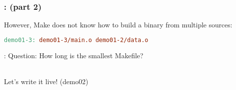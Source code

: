 \begin{frame}[fragile]
    \frametitle{\secname: \small\subsecname (part 2)\normalsize}

    However, Make does not know how to build a binary from multiple sources:

    \begin{lstlisting}[language=make]
demo01-3: demo01-3/main.o demo01-2/data.o
    \end{lstlisting}
\end{frame}

\begin{frame}{\secname: \small\subsecname\normalsize}
    Question: How long is the smallest Makefile? \\~\\ \pause

    Let's write it live! (demo02)

\end{frame}
